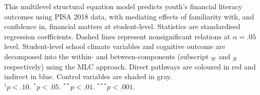 {
}{This multilevel structural equation model predicts youth's financial literacy outcomes using PISA 2018 data, with mediating effects of familiarity with, and confidence in, financial matters at student-level. Statistics are standardised regression coefficients. Dashed lines represent nonsignificant relations at $\alpha=.05$ level. Student-level school climate variables and cognitive outcome are decomposed into the within- and between-components (subscript $_W$ and $_B$ respectively) using the MLC approach. Direct pathways are coloured in red and indirect in blue. Control variables are shaded in gray.\\
$^\dagger p < .10$. $^* p < .05$. $^{**} p < .01$. $^{***} p < .001$.}
